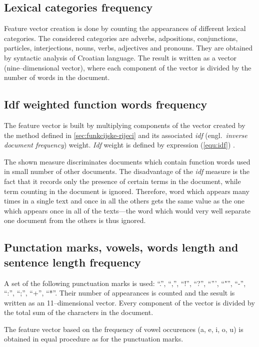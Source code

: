 \documentclass[11pt,english]{article}
\newcommand{\engl}[1]{(engl.~\emph{#1})}
\begin{document}
\begin{multicols}{2}
\subsection{Lexical categories frequency}
\label{sec:rijeci-grupe}
Feature vector creation is done by counting the appearances of
different lexical categories. The considered categories are adverbs,
adpositions, conjunctions, particles, interjections, nouns, verbs, adjectives and
pronouns. They are obtained by syntactic analysis of Croatian language. The result is
written as a vector (nine--dimensional vector), where each component of the vector
is divided by the number of words in the document.

\subsection{Idf weighted function words frequency}
\label{sec:funkcijske-rijeci-idf}
The feature vector is built by multiplying components of the vector created by the method
defined in \ref{sec:funkcijske-rijeci} and its associated \emph{idf}
\engl{inverse document frequency} weight. \emph{Idf} weight is defined by
expression (\ref{equ:idf}) \citep{diederich2003authorship}.

The shown measure discriminates documents which contain function words used
in small number of other documents. The disadvantage of the \emph{idf} measure is
the fact that it records only the presence of certain terms in the document, while term
counting in the document is ignored. Therefore, word which appears many times in
a single text and once in all the others gets the same value as the one which appears
once in all of the texts---the word which would very well separate one document from the
others is thus ignored.

\subsection{Punctation marks, vowels, words length and sentence length
frequency}
\label{sec:znacajke-manje}
A set of the following punctuation marks is used: ``.'', ``,'', ``!'', ``?'',
``''', ``"'', ``-'', ``:'', ``;'', ``+'', ``*''. Their number of appearances is counted and 
the sesult is written as an 11--dimensional vector. Every
component of the vector is divided by the total sum of the characters in the document.

The feature vector based on the frequency of vowel occurences (a, e, i, o, u) is
obtained in equal procedure as for the punctuation marks.


\end{multicols}
\end{document}
